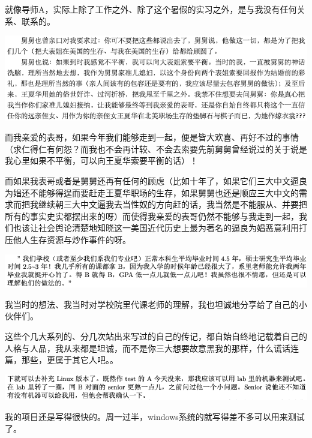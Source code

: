 \documentclass[9pt, b5paper]{article}
\begin{document}
就像导师A，实际上除了工作之外、除了这个暑假的实习之外，是与我没有任何关系、联系的。

\begin{center}
\includegraphics[width=.9\linewidth]{./pic/backups_plans_20210514_222850.png}
\end{center}

而我亲爱的表哥，如果今年我们能够走到一起，便是皆大欢喜、再好不过的事情（求仁得仁有何怨？而我也不会再计较、不会去索要先前舅舅曾经说过的关于说是我心里如果不平衡，可以向王夏华索要平衡的话）！

而如果我表哥或者是舅舅还再有任何的顾虑（比如十年了，如果它们三大中文逼良为娼还不能够得逞而要赶走王夏华职场的生存，如果舅舅也还是顺应三大中文的需求而把我继续朝三大中文逼我去当性奴的方向赶的话，我当然是不能服从、并要把所有的事实史实都摆出来的呀）而使得我亲爱的表哥仍然不能够与我走到一起，我们也该让社会舆论清楚地知晓这一美国近代历史上最为著名的逼良为娼恶意利用打压他人生存资源与炒作事件的呀。 

\begin{center}
\includegraphics[width=.9\linewidth]{./pic/backups_plans_20210514_124849.png}
\end{center}

我当时的想法、我当时对学校院里代课老师的理解，我也坦诚地分享给了自己的小伙伴们。

这些个几大系列的、分几次站出来写过的自己的传记，都自始自终地记载着自己的人格与人品，我从来都是坦诚，而不是你三大想要故意黑我的那样，什么谎话连篇，那些，更属于其它人吧。。

\begin{center}
\includegraphics[width=.9\linewidth]{./pic/backups_plans_20210514_115800.png}
\end{center}

我的项目还是写得很快的。周一过半，windows系统的就写得差不多可以用来测试了。
\end{document}
